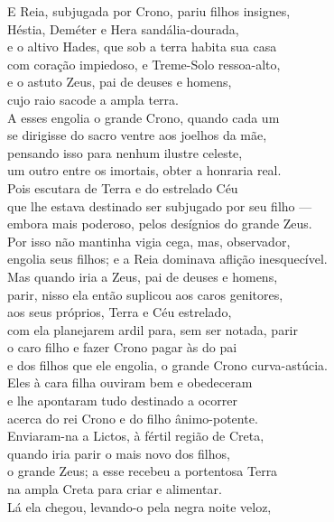 \begin{pages}
\begin{Rightside}
\Para
E Reia, subjugada por Crono, pariu filhos insignes,\\
Héstia, Deméter e Hera sandália-dourada,\\
e o altivo Hades, que sob a terra habita sua casa \\
com coração impiedoso, e Treme-Solo ressoa-alto,\\
e o astuto Zeus, pai de deuses e homens,\\
cujo raio sacode a ampla terra.\\
A esses engolia o grande Crono, quando cada um\\
se dirigisse do sacro ventre aos joelhos da mãe, \\
pensando isso para nenhum ilustre celeste,\\
um outro entre os imortais, obter a honraria real.\\
Pois escutara de Terra e do estrelado Céu\\
que lhe estava destinado ser subjugado por seu filho ---\\
embora mais poderoso, pelos desígnios do grande Zeus. \\
Por isso não mantinha vigia cega, mas, observador,\\
engolia seus filhos; e a Reia dominava aflição inesquecível.\\
Mas quando iria a Zeus, pai de deuses e homens,\\
parir, nisso ela então suplicou aos caros genitores,\\
aos seus próprios, Terra e Céu estrelado, \\
com ela planejarem ardil para, sem ser notada, parir\\
o caro filho e fazer Crono pagar às  do pai\\
e dos filhos que ele engolia, o grande Crono curva-astúcia.\\
Eles à cara filha ouviram bem e obedeceram\\
e lhe apontaram tudo destinado a ocorrer \\
acerca do rei Crono e do filho ânimo-potente.\\
Enviaram-na a Lictos, à fértil região de Creta,\\
quando iria parir o mais novo dos filhos,\\
o grande Zeus; a esse recebeu a portentosa Terra\\
na ampla Creta para criar e alimentar. \\
Lá ela chegou, levando-o pela negra noite veloz,\\

\end{Rightside}
\end{pages}
